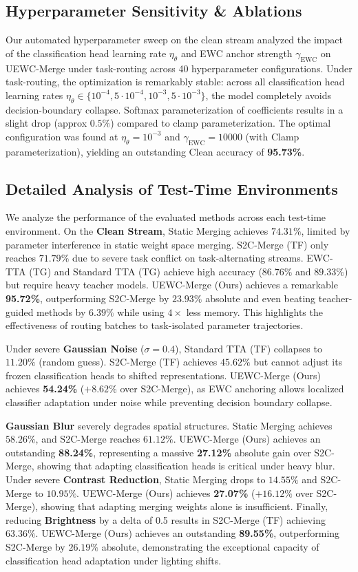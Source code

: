 \documentclass{article}
\theoremstyle{plain}
\theoremstyle{definition}
\theoremstyle{remark}
\begin{document}
\subsection{Hyperparameter Sensitivity \& Ablations}
Our automated hyperparameter sweep on the clean stream analyzed the impact of the classification head learning rate $\eta_{\theta}$ and EWC anchor strength $\gamma_{\text{EWC}}$ on UEWC-Merge under task-routing across 40 hyperparameter configurations. Under task-routing, the optimization is remarkably stable: across all classification head learning rates $\eta_{\theta} \in \{10^{-4}, 5\cdot 10^{-4}, 10^{-3}, 5\cdot 10^{-3}\} $, the model completely avoids decision-boundary collapse. Softmax parameterization of coefficients results in a slight drop (approx $0.5\%$) compared to clamp parameterization. The optimal configuration was found at $\eta_{\theta} = 10^{-3}$ and $\gamma_{\text{EWC}} = 10000$ (with Clamp parameterization), yielding an outstanding Clean accuracy of \textbf{95.73\%}.

\subsection{Detailed Analysis of Test-Time Environments}
We analyze the performance of the evaluated methods across each test-time environment. On the \textbf{Clean Stream}, Static Merging achieves $74.31\%$, limited by parameter interference in static weight space merging. S2C-Merge (TF) only reaches $71.79\%$ due to severe task conflict on task-alternating streams. EWC-TTA (TG) and Standard TTA (TG) achieve high accuracy ($86.76\%$ and $89.33\%$) but require heavy teacher models. UEWC-Merge (Ours) achieves a remarkable \textbf{95.72\%}, outperforming S2C-Merge by $23.93\%$ absolute and even beating teacher-guided methods by $6.39\%$ while using $4\times$ less memory. This highlights the effectiveness of routing batches to task-isolated parameter trajectories.

Under severe \textbf{Gaussian Noise} ($\sigma = 0.4$), Standard TTA (TF) collapses to $11.20\%$ (random guess). S2C-Merge (TF) achieves $45.62\%$ but cannot adjust its frozen classification heads to shifted representations. UEWC-Merge (Ours) achieves \textbf{54.24\%} ($+8.62\%$ over S2C-Merge), as EWC anchoring allows localized classifier adaptation under noise while preventing decision boundary collapse.

\textbf{Gaussian Blur} severely degrades spatial structures. Static Merging achieves $58.26\%$, and S2C-Merge reaches $61.12\%$. UEWC-Merge (Ours) achieves an outstanding \textbf{88.24\%}, representing a massive \textbf{27.12\%} absolute gain over S2C-Merge, showing that adapting classification heads is critical under heavy blur. Under severe \textbf{Contrast Reduction}, Static Merging drops to $14.55\%$ and S2C-Merge to $10.95\%$. UEWC-Merge (Ours) achieves \textbf{27.07\%} ($+16.12\%$ over S2C-Merge), showing that adapting merging weights alone is insufficient. Finally, reducing \textbf{Brightness} by a delta of 0.5 results in S2C-Merge (TF) achieving $63.36\%$. UEWC-Merge (Ours) achieves an outstanding \textbf{89.55\%}, outperforming S2C-Merge by $26.19\%$ absolute, demonstrating the exceptional capacity of classification head adaptation under lighting shifts.
\end{document}
